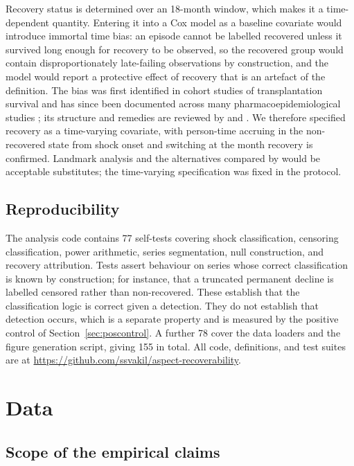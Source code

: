 \documentclass[11pt,a4paper]{article}
\makeatletter
\let\original@section\section
\renewcommand{\section}{\FloatBarrier\original@section}%
\let\original@subsection\subsection
\renewcommand{\subsection}{\FloatBarrier\original@subsection}%
\makeatother
\begin{document}
Recovery status is determined over an 18-month window, which makes it a
time-dependent quantity. Entering it into a Cox model as a baseline covariate
would introduce immortal time bias: an episode cannot be labelled recovered
unless it survived long enough for recovery to be observed, so the recovered
group would contain disproportionately late-failing observations by
construction, and the model would report a protective effect of recovery that
is an artefact of the definition. The bias was first identified in cohort
studies of transplantation survival and has since been documented across many
pharmacoepidemiological studies \citep{suissa2007, suissa2008, levesque2010};
its structure and remedies are reviewed by \citet{platt2019} and
\citet{yadav2021}. We therefore specified recovery as a time-varying covariate,
with person-time accruing in the non-recovered state from shock onset and
switching at the month recovery is confirmed. Landmark analysis
\citep{mi2016} and the alternatives compared by \citet{karim2016} would be
acceptable substitutes; the time-varying specification was fixed in the protocol.

\subsection{Reproducibility}

The analysis code contains 77 self-tests covering shock classification, censoring
classification, power arithmetic, series segmentation, null construction, and
recovery attribution. Tests assert behaviour on series whose correct classification is known by
construction; for instance, that a truncated permanent decline is labelled
censored rather than non-recovered. These establish that the classification
logic is correct given a detection. They do not establish that detection
occurs, which is a separate property and is measured by the positive control of
Section~\ref{sec:poscontrol}. A further 78 cover the data loaders and the
figure generation script, giving 155 in total. All code, definitions, and test
suites are at \url{https://github.com/ssvakil/aspect-recoverability}.

\section{Data}

\subsection{Scope of the empirical claims}
\end{document}
